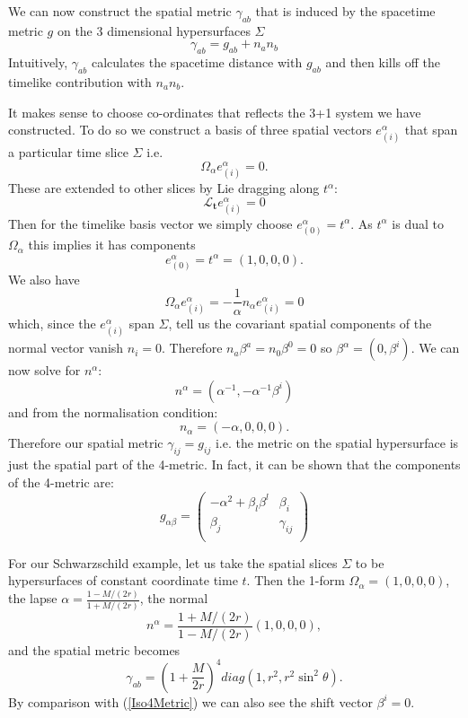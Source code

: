 \documentclass{article}
\begin{document}
We can now construct the spatial metric $\gamma_{ab}$ that is induced by  the spacetime metric $g$ on the 3 dimensional hypersurfaces $\Sigma$
\[ \gamma_{ab} = g_{ab} + n_a n_b \]
Intuitively,  $\gamma_{ab}$ calculates the spacetime distance with $g_{ab}$ and then kills off the timelike contribution with $n_a n_b$.

It makes sense to choose co-ordinates that reflects the 3+1 system we have constructed. To do so we construct a basis of three spatial vectors $e^\alpha_{(i)}$ that span a particular time slice $\Sigma$ i.e.
\[ \Omega_\alpha e^\alpha_{(i)}=0. \]
These are extended to other slices by Lie dragging along $t^\alpha$:
\[ \mathcal{L}_{\mathbf{t}} e^\alpha_{(i)}=0 \]
Then for the timelike basis vector we simply choose $e^\alpha_{(0)}=t^\alpha$. As $t^\alpha$ is dual to $\Omega_\alpha$ this implies it has components 
\[ e^\alpha_{(0)}=t^\alpha=(1,0,0,0). \]
We also have
\[ \Omega_\alpha e^\alpha_{(i)}= -\frac{1}{\alpha}n_\alpha e^\alpha_{(i)}=0 \]
which, since the $e^\alpha_{(i)}$ span $\Sigma$, tell us the covariant spatial components of the normal vector vanish $n_i=0$. Therefore $n_a \beta^a = n_0 \beta^0 =0$ so $\beta^\alpha = (0, \beta^i)$. We can now solve for $n^\alpha$:
\[ n^\alpha =(\alpha^{-1},-\alpha^{-1}\beta^i) \]
and from the normalisation condition:
\[ n_\alpha=(-\alpha, 0,0,0).\]
Therefore our spatial metric $\gamma_{ij}=g_{ij}$ i.e. the metric on the spatial hypersurface is just the spatial part of the 4-metric. In fact, it can be shown that the components of the 4-metric are:
 \begin{equation}
 g_{\alpha \beta}=\left( \begin{array}{cc}
 -\alpha^2 + \beta_l \beta^l & \beta_i \\
 \beta_j & \gamma_{ij} \\ \end{array} \right)
 \end{equation}


For our Schwarzschild example, let us take the spatial slices $\Sigma$ to be hypersurfaces of constant coordinate time $t$. Then the 1-form $\Omega_\alpha = (1,0,0,0)$, the lapse $\alpha = \frac{1-M/(2r)}{1+M/(2r)}$, the normal 
\[ n^\alpha=\frac{1+M/(2r)}{1-M/(2r)}(1,0,0,0), \]
and the spatial metric becomes
\begin{equation}
 \gamma_{ab}=\left( 1+ \frac{M}{2r} \right)^4 diag(1,r^2, r^2 \sin^2\theta). 
\end{equation}\label{Iso3Metric}
By comparison with (\ref{Iso4Metric}) we can also see the shift vector $\beta^i=0$.
\end{document}

